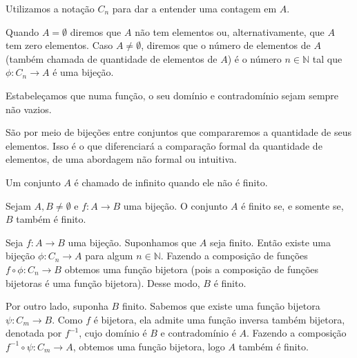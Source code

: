 \documentclass[../main.tex]{subfiles}
\begin{document}
Utilizamos a notação $C_n$ para dar a entender uma contagem em $A$.

Quando $A = \emptyset$ diremos que $A$ não tem elementos ou, alternativamente, que $A$ tem zero elementos. Caso $A \neq \emptyset$, diremos que o número de elementos de $A$ (também chamada de quantidade de elementos de $A$) é o número $n \in \mathbb{N}$ tal que $\phi \colon C_n \to A$ é uma bijeção.

Estabeleçamos que numa função, o seu domínio e contradomínio sejam sempre não vazios.

São por meio de bijeções entre conjuntos que compararemos a quantidade de seus elementos. Isso é o que diferenciará a comparação formal da quantidade de elementos, de uma abordagem não formal ou intuitiva.

\begin{defi}\label{enum-def-conjuntoInfinito}
    Um conjunto $A$ é chamado de infinito quando ele não é finito.
\end{defi}
\begin{teo}
    Sejam $A,B \neq \emptyset$ e $f \colon A \to B$ uma bijeção. O conjunto $A$ é finito se, e somente se, $B$ também é finito.
\end{teo}
\begin{dem}
    Seja $f \colon A \to B$ uma bijeção. Suponhamos que $A$ seja finito. Então existe uma bijeção 
    $\phi \colon C_n \to A$ para algum $n \in \mathbb{N}$. Fazendo a composição de funções
    $f \circ \phi \colon C_n \to B$ obtemos uma função bijetora (pois a composição de funções bijetoras é uma função bijetora). Desse modo, $B$ é finito.

    Por outro lado, suponha $B$ finito. Sabemos que existe uma função bijetora ${\psi \colon C_m \to B}$. Como $f$ é bijetora, ela admite uma função inversa também bijetora, denotada por $f^{-1}$, cujo domínio é $B$ e contradomínio é $A$. Fazendo a composição $f^{-1} \circ \psi \colon C_m \to A$, obtemos uma função bijetora, logo $A$ também é finito. 
\end{dem}
\end{document}
